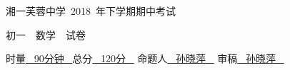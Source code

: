 \documentclass[12pt,landscape,UTF8,onecolumn]{ctexart}
\author{龙哲}
\begin{document}
  \noindent	
  \begin{spacing}{1.5}
    \begin{center}
       \heiti 湘一芙蓉中学~2018~年下学期期中考试

      初一~~数学~~试卷

       时量\underline{~ 90分钟 ~}总分\underline{~ 120分 ~} 命题人\underline{~ 孙晓萍 ~} 审稿\underline{~ 孙晓萍 ~}
       \songti \vspace{2mm}
    \end{center}
  \end{spacing}
  \vspace{-10pt} 
\end{document}

